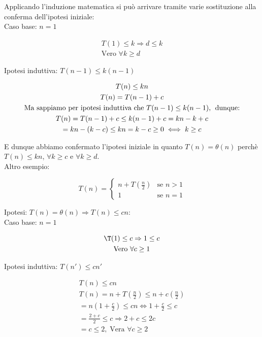 \documentclass[a4paper, 12pt]{article} %
\begin{document}
Applicando l'induzione matematica si può arrivare tramite varie sostituzione alla conferma dell'ipotesi iniziale: \\

Caso base: $n = 1$ 

\begin{gather*}
  T(1) \leq k \Rightarrow d \leq k \\
  \text{Vero $\forall k \geq d$}
\end{gather*}

Ipotesi induttiva: $T(n-1) \leq k(n-1)$ 

\begin{gather*}
  T(n) \leq kn \\
  T(n) = T(n-1) + c \\
  \text{Ma sappiamo per ipotesi induttiva che $T(n-1) \leq k(n-1)$,\; dunque:} \\
  T(n) = T(n-1) + c \leq k(n-1) +c = kn - k + c \\
  = kn - (k - c) \leq kn = k - c \geq 0 \iff k \geq c
\end{gather*}

E dunque abbiamo confermato l'ipotesi iniziale in quanto $T(n) = \theta(n)$ perchè $T(n) \leq kn$, $\forall k \geq c$ e $\forall k \geq d$. \\

Altro esempio:

$$
T(n) = \begin{cases}
  n + T(\frac{n}{2}) & \text{se $n > 1$} \\
  1 & \text{se $n=1$}
\end{cases}
$$

Ipotesi: $T(n) = \theta(n) \Rightarrow T(n) \leq cn$: \\

Caso base: $n = 1$

\begin{gather*}
  \T(1) \leq c \Rightarrow 1 \leq c \\
  \text{Vero $\forall c \geq 1$}
\end{gather*}


Ipotesi induttiva: $T(n') \leq cn'$

\begin{gather*}
  T(n) \leq cn \\
  T(n) = n + T(\frac{n}{2}) \leq n + c(\frac{n}{2}) \\
  = n(1+\frac{c}{2}) \leq cn \iff 1 + \frac{c}{2} \leq c \\
  = \frac{2+c}{2} \leq c \Rightarrow 2 + c \leq 2c \\
  = c \leq 2, \; \text{Vera $\forall c\geq 2$}
\end{gather*}

\vfill

\end{document}

